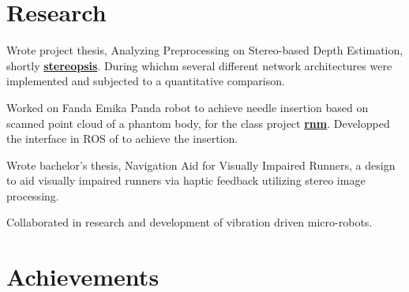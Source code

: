 \documentclass[]{resume}
\begin{document}
\begin{minipage}[t]{0.66\textwidth}
\begin{minipage}[t]{0.90\textwidth}

		\section{Research}

		\begin{tightemize}
			\item Wrote project thesis, Analyzing Preprocessing on Stereo-based Depth Estimation, shortly \textbf{\href{https://github.com:octaskin/stereopsis}{stereopsis}}. During whichm several different network architectures were implemented and subjected to a quantitative comparison.
			\item Worked on Fanda Emika Panda robot to achieve needle insertion based on scanned point cloud of a phantom body, for the class project \textbf{\href{https://github.com/octaskin/rnm}{rnm}}. Developped the interface in ROS of to achieve the insertion.
		\end{tightemize}
		\sectionsep

		\begin{tightemize}
			\item Wrote bachelor's thesis, Navigation Aid for Visually Impaired Runners, a design to aid visually impaired runners via haptic feedback utilizing stereo image processing.
			\item Collaborated in research and development of vibration driven micro-robots.
		\end{tightemize}
		\sectionsep



		\vspace{-3pt}

		\section{Achievements}


\end{minipage}
\end{minipage}
\end{document}
